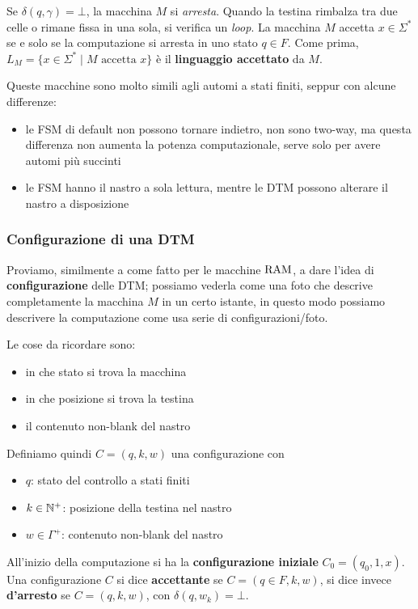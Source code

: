 Se $\delta(q, \gamma) = \bot$, la macchina $M$ si \textit{arresta}. Quando la testina rimbalza tra due celle o rimane fissa in una sola, si verifica un \textit{loop}. La macchina $M$ accetta $x \in \Sigma^\ast$ se e solo se la computazione si arresta in uno stato $q \in F$.  Come prima, $L_M = \{x \in \Sigma^\ast \mid M \text{ accetta } x\}$ è il \textbf{linguaggio accettato} da $M$.

Queste macchine sono molto simili agli automi a stati finiti, seppur con alcune differenze: 
\begin{itemize}
	\item le FSM di default non possono tornare indietro, non sono two-way, ma questa differenza non aumenta la potenza computazionale, serve solo per avere automi più succinti
	\item le FSM hanno il nastro a sola lettura, mentre le DTM possono alterare il nastro a disposizione
\end{itemize}

\subsubsection{Configurazione di una DTM}

Proviamo, similmente a come fatto per le macchine $\text{RAM}$, a dare l'idea di \textbf{configurazione} delle DTM; possiamo vederla come una foto che descrive completamente la macchina $M$ in un certo istante, in questo modo possiamo descrivere la computazione come usa serie di configurazioni/foto.

Le cose da ricordare sono: 
\begin{itemize}
	\item in che stato si trova la macchina
	\item in che posizione si trova la testina
	\item il contenuto non-blank del nastro
\end{itemize}

Definiamo quindi $C = (q,k,w)$ una configurazione con
\begin{itemize}
	\item $q$: stato del controllo a stati finiti
	\item $k \in \mathbb{N}^+$: posizione della testina nel nastro
	\item $w \in \Gamma^+$: contenuto non-blank del nastro
\end{itemize}

All'inizio della computazione si ha la \textbf{configurazione iniziale} $C_0 = (q_0, 1, x)$. Una configurazione $C$ si dice \textbf{accettante} se $C = (q \in F, k, w)$, si dice invece \textbf{d'arresto} se $C = (q, k, w)$, con $\delta (q,w_{k}) = \bot$.

